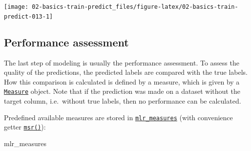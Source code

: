 \documentclass[
]{scrbook}
\newenvironment{Shaded}{\begin{snugshade}}{\end{snugshade}}
\newcommand{\AttributeTok}[1]{\textcolor[rgb]{0.77,0.63,0.00}{#1}}
\newcommand{\FunctionTok}[1]{\textcolor[rgb]{0.00,0.00,0.00}{#1}}
\newcommand{\NormalTok}[1]{#1}
\newcommand{\OtherTok}[1]{\textcolor[rgb]{0.56,0.35,0.01}{#1}}
\newcommand{\SpecialCharTok}[1]{\textcolor[rgb]{0.00,0.00,0.00}{#1}}
\newcommand{\StringTok}[1]{\textcolor[rgb]{0.31,0.60,0.02}{#1}}
\renewenvironment{Shaded} {\begin{snugshade}\small} {\end{snugshade}}
\begin{document}
\begin{Shaded}
\end{Shaded}

\begin{center}\texttt{[image: 02-basics-train-predict\_files/figure-latex/02-basics-train-predict-013-1]} \end{center}

\hypertarget{measure}{%
\subsection{Performance assessment}\label{measure}}

The last step of modeling is usually the performance assessment.
To assess the quality of the predictions, the predicted labels are compared with the true labels.
How this comparison is calculated is defined by a measure, which is given by a \href{https://mlr3.mlr-org.com/reference/Measure.html}{\texttt{Measure}} object.
Note that if the prediction was made on a dataset without the target column, i.e.~without true labels, then no performance can be calculated.

Predefined available measures are stored in \href{https://mlr3.mlr-org.com/reference/mlr_measures.html}{\texttt{mlr\_measures}} (with convenience getter \href{https://mlr3.mlr-org.com/reference/mlr_sugar.html}{\texttt{msr()}}):

\begin{Shaded}
\begin{Highlighting}[]
\NormalTok{mlr\_measures}
\end{Highlighting}
\end{Shaded}
\end{document}
